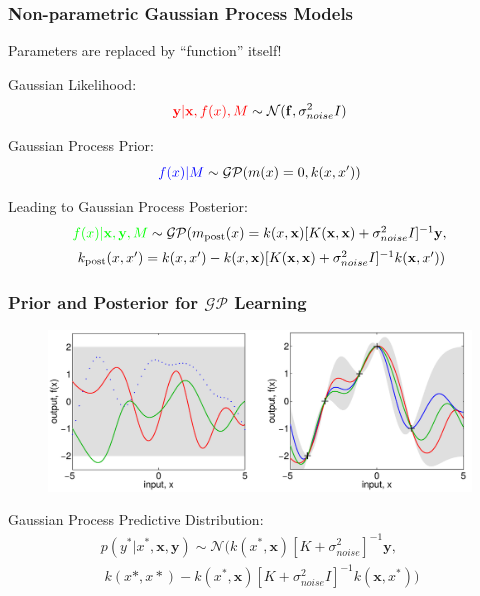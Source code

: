 \documentclass[10pt]{beamer}
\newcommand{\bx}{\mathbf{x}}
\newcommand{\by}{\mathbf{y}}
\newcommand{\boldf}{\mathbf{f}}
\newcommand{\gp}{\mathcal{GP}}
\newcommand{\gaussN}{\mathcal{N}}
\begin{document}
  \begin{frame}
    \frametitle{Non-parametric Gaussian Process Models}
    Parameters are replaced by ``function'' itself!

    Gaussian Likelihood:
      \begin{equation*}
        \textcolor{red}{\by|\bx,f(x),M} \sim \gaussN(\boldf, \sigma^2_{noise}I)
      \end{equation*}

    Gaussian Process Prior:
      \begin{equation*}
        \textcolor{blue}{f(x)|M} \sim \gp(m(x) = 0, k(x,x'))
      \end{equation*}

    Leading to Gaussian Process Posterior:
      \begin{equation*}
        \begin{array}{c}
          \textcolor{green}{f(x)|\bx,\by,M} \sim \gp ( m_{\text{post}}(x) = k(x,\bx)[K(\bx,\bx) + \sigma^2_{noise}I]^{-1} \by, \\[0.2cm]
          \; k_{\text{post}}(x,x') =  k(x,x') - k(x,\bx)[K(\bx,\bx) + \sigma^2_{noise}I]^{-1} k(\bx,x') )
        \end{array}
      \end{equation*}
    \end{frame}

  \begin{frame}
    \frametitle{Prior and Posterior for $\gp$ Learning}

    \begin{figure}
      \centering
      \includegraphics[width=\textwidth]{gpRegression.png}
    \end{figure}

    Gaussian Process Predictive Distribution:
      \begin{equation*}
        \begin{array}{c}
          p(y^*|x^*,\bx,\by) \sim \gaussN ( k(x^*,\bx)[K + \sigma^2_{noise}]^{-1}\by, \\[0.2cm]
          \; k(x*,x*) - k(x^*,\bx)[K + \sigma^2_{noise}I]^{-1} k(\bx,x^*) )
        \end{array}
      \end{equation*}
  \end{frame}
\end{document}
